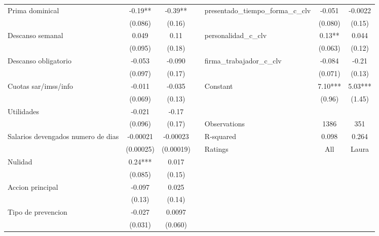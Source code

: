 \begin{tabular}{lccrrcc}
Prima dominical & -0.19** & -0.39** &       & \multicolumn{1}{l}{presentado_tiempo_forma_c_clv} & -0.051 & -0.0022 \\
      & (0.086) & (0.16) &       & \multicolumn{1}{l}{} & (0.080) & (0.15) \\
Descanso semanal & 0.049 & 0.11  &       & \multicolumn{1}{l}{personalidad_c_clv} & 0.13** & 0.044 \\
      & (0.095) & (0.18) &       & \multicolumn{1}{l}{} & (0.063) & (0.12) \\
Descanso obligatorio & -0.053 & -0.090 &       & \multicolumn{1}{l}{firma_trabajador_c_clv} & -0.084 & -0.21 \\
      & (0.097) & (0.17) &       & \multicolumn{1}{l}{} & (0.071) & (0.13) \\
Cuotas sar/imss/info & -0.011 & -0.035 &       & \multicolumn{1}{l}{Constant} & 7.10*** & 5.03*** \\
      & (0.069) & (0.13) &       & \multicolumn{1}{l}{} & (0.96) & (1.45) \\
Utilidades & -0.021 & -0.17 &       &       &       &  \\
\cmidrule{5-7}      & (0.096) & (0.17) &       & \multicolumn{1}{l}{Observations} & 1386  & 351 \\
Salarios devengados numero de dias & -0.00021 & -0.00023 &       & \multicolumn{1}{l}{R-squared} & 0.098 & 0.264 \\
      & (0.00025) & (0.00019) &       & \multicolumn{1}{l}{Ratings} & All   & Laura \\
\cmidrule{5-7}Nulidad & 0.24*** & 0.017 &       &       &       &  \\
      & (0.085) & (0.15) &       &       &       &  \\
Accion principal & -0.097 & 0.025 &       &       &       &  \\
      & (0.13) & (0.14) &       &       &       &  \\
Tipo de prevencion & -0.027 & 0.0097 &       &       &       &  \\
      & (0.031) & (0.060) &       &       &       &  \\
\end{tabular}%

